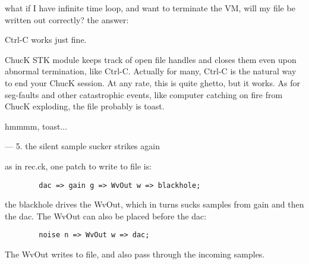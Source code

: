 what if I have infinite time loop, and want to terminate
the VM, will my file be written out correctly?  the answer:

Ctrl-C works just fine.

ChucK STK module keeps track of open file handles and
closes them even upon abnormal termination, like Ctrl-C.
Actually for many, Ctrl-C is the natural way to end your
ChucK session.  At any rate, this is quite ghetto, but it works.
As for seg-faults and other catastrophic events, like computer
catching on fire from ChucK exploding, the file probably is
toast.

hmmmm, toast...


---
5. the silent sample sucker strikes again

as in rec.ck, one patch to write to file is:
\begin{verbatim}
        dac => gain g => WvOut w => blackhole;
\end{verbatim}
the blackhole drives the WvOut, which in turns sucks
samples from gain and then the dac.  The WvOut
can also be placed before the dac:
\begin{verbatim}
        noise n => WvOut w => dac;
\end{verbatim}
The WvOut writes to file, and also pass through the incoming samples.
